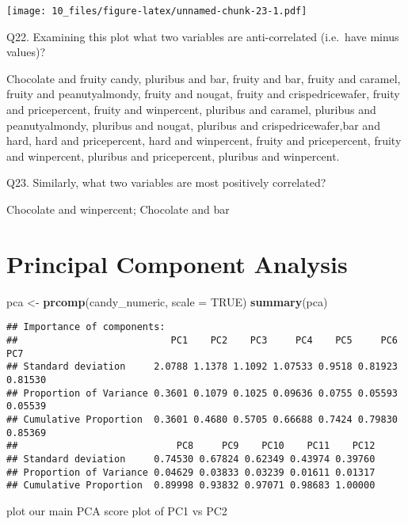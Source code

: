 \documentclass[
]{article}
\newenvironment{Shaded}{\begin{snugshade}}{\end{snugshade}}
\newcommand{\AttributeTok}[1]{\textcolor[rgb]{0.13,0.29,0.53}{#1}}
\newcommand{\ConstantTok}[1]{\textcolor[rgb]{0.56,0.35,0.01}{#1}}
\newcommand{\DecValTok}[1]{\textcolor[rgb]{0.00,0.00,0.81}{#1}}
\newcommand{\FunctionTok}[1]{\textcolor[rgb]{0.13,0.29,0.53}{\textbf{#1}}}
\newcommand{\NormalTok}[1]{#1}
\newcommand{\OtherTok}[1]{\textcolor[rgb]{0.56,0.35,0.01}{#1}}
\newcommand{\SpecialCharTok}[1]{\textcolor[rgb]{0.81,0.36,0.00}{\textbf{#1}}}
\begin{document}
\texttt{[image: 10\_files/figure-latex/unnamed-chunk-23-1.pdf]}

Q22. Examining this plot what two variables are anti-correlated
(i.e.~have minus values)?

Chocolate and fruity candy, pluribus and bar, fruity and bar, fruity and
caramel, fruity and peanutyalmondy, fruity and nougat, fruity and
crispedricewafer, fruity and pricepercent, fruity and winpercent,
pluribus and caramel, pluribus and peanutyalmondy, pluribus and nougat,
pluribus and crispedricewafer,bar and hard, hard and pricepercent, hard
and winpercent, fruity and pricepercent, fruity and winpercent, pluribus
and pricepercent, pluribus and winpercent.

Q23. Similarly, what two variables are most positively correlated?

Chocolate and winpercent; Chocolate and bar

\hypertarget{principal-component-analysis}{%
\section{Principal Component
Analysis}\label{principal-component-analysis}}

\begin{Shaded}
\begin{Highlighting}[]
\NormalTok{pca }\OtherTok{\textless{}{-}} \FunctionTok{prcomp}\NormalTok{(candy\_numeric, }\AttributeTok{scale =} \ConstantTok{TRUE}\NormalTok{)}
\FunctionTok{summary}\NormalTok{(pca)}
\end{Highlighting}
\end{Shaded}

\begin{verbatim}
## Importance of components:
##                           PC1    PC2    PC3     PC4    PC5     PC6     PC7
## Standard deviation     2.0788 1.1378 1.1092 1.07533 0.9518 0.81923 0.81530
## Proportion of Variance 0.3601 0.1079 0.1025 0.09636 0.0755 0.05593 0.05539
## Cumulative Proportion  0.3601 0.4680 0.5705 0.66688 0.7424 0.79830 0.85369
##                            PC8     PC9    PC10    PC11    PC12
## Standard deviation     0.74530 0.67824 0.62349 0.43974 0.39760
## Proportion of Variance 0.04629 0.03833 0.03239 0.01611 0.01317
## Cumulative Proportion  0.89998 0.93832 0.97071 0.98683 1.00000
\end{verbatim}

plot our main PCA score plot of PC1 vs PC2

\begin{Shaded}
\end{Shaded}
\end{document}
